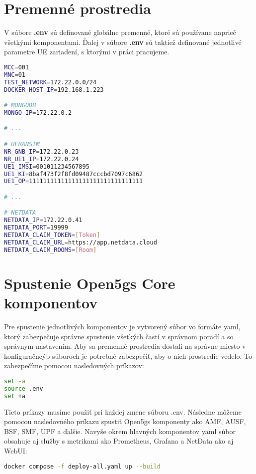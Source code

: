 \begin{refsegment}
\section{Premenné prostredia}
V súbore \textbf{.env} sú definované globálne premenné, ktoré sú používane naprieč všetkými komponentami. Ďalej v súbore \textbf{.env} sú taktiež definované jednotlivé parametre UE zariadení, s ktorými v práci pracujeme.

\begin{lstlisting}[language=bash,caption={Súbor .env}, style=env]
MCC=001
MNC=01
TEST_NETWORK=172.22.0.0/24
DOCKER_HOST_IP=192.168.1.223

# MONGODB
MONGO_IP=172.22.0.2

# ...

# UERANSIM
NR_GNB_IP=172.22.0.23
NR_UE1_IP=172.22.0.24
UE1_IMSI=001011234567895
UE1_KI=8baf473f2f8fd09487cccbd7097c6862
UE1_OP=11111111111111111111111111111111

# ...

# NETDATA
NETDATA_IP=172.22.0.41
NETDATA_PORT=19999
NETDATA_CLAIM_TOKEN=[Token]
NETDATA_CLAIM_URL=https://app.netdata.cloud
NETDATA_CLAIM_ROOMS=[Room]
\end{lstlisting}

\section{Spustenie Open5gs Core komponentov}
Pre spustenie jednotlivých komponentov je vytvorený súbor vo formáte yaml, ktorý zabezpečuje správne spustenie všetkých častí v správnom poradí a so správnym nastavením. Aby sa premenné prostredia dostali na správne miesto v konfiguračncýb súboroch je potrebné zabezpečiť, aby o nich prostredie vedelo. To zabezpečíme pomocou nasledovných príkazov:

\begin{lstlisting}[language=bash,caption={Nastavenie zdroja premenných}, style=docker]
set -a
source .env
set +a
\end{lstlisting}

Tieto príkazy musíme použiť pri každej zmene súboru .env. Následne môžeme pomocou nasledovného príkazu spustiť Open5gs komponenty ako AMF, AUSF, BSF, SMF, UPF a ďalšie. Navyše okrem hlavných komponentov yaml súbor obsahuje aj služby s metrikami ako Prometheus, Grafana a NetData ako aj WebUI:

\begin{lstlisting}[language=bash,caption={Spustenie}, style=docker]
docker compose -f deploy-all.yaml up --build
\end{lstlisting}


\end{refsegment}
